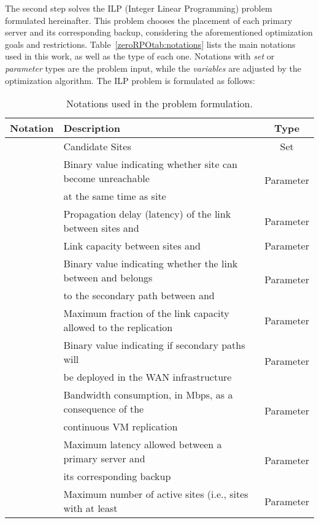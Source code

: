 \documentclass[preprint]{elsarticle}
\begin{document}
The second step solves the ILP (Integer Linear Programming) problem formulated hereinafter. This problem chooses the placement of each primary server and its corresponding backup, considering the aforementioned optimization goals and restrictions. Table~\ref{zeroRPOtab:notations} lists the main notations used in this work, as well as the type of each one. Notations with \textit{set} or \textit{parameter} types are the problem input, while the \textit{variables} are adjusted by the optimization algorithm. The ILP problem is formulated as follows:
\begin{table}
\caption{Notations used in the problem formulation.}
\centering
\scriptsize
\begin{center}
\begin{tabular}{|c||l||c|}
\hline \textbf{Notation} &\textbf{Description} &\textbf{Type}\\
\hline  &Candidate Sites &Set\\
\hline \multirow{2}{*}{} &Binary value indicating whether site  can become unreachable &\multirow{2}{*}{Parameter}\\
&at the same time as site   &\\
\hline  &Propagation delay (latency) of the link between sites  and  &Parameter\\
\hline  &Link capacity between sites  and  &Parameter\\
\hline \multirow{2}{*}{} &Binary value indicating whether the link between  and  belongs &\multirow{2}{*}{Parameter}\\
&to the secondary path between  and  &\\
\hline  &Maximum fraction of the link capacity allowed to the replication &Parameter\\
\hline \multirow{2}{*}{} &Binary value indicating if secondary paths will &\multirow{2}{*}{Parameter}\\
&be deployed in the WAN infrastructure&\\
\hline \multirow{2}{*}{} &Bandwidth consumption, in Mbps, as a consequence of the  &\multirow{2}{*}{Parameter}\\
&continuous VM replication &\\
\hline \multirow{2}{*}{} &Maximum latency allowed between a primary server and  &\multirow{2}{*}{Parameter}\\
&its corresponding backup &\\
\hline \multirow{2}{*}{} &Maximum number of active sites (i.e., sites with at least   &\multirow{2}{*}{Parameter}\\

\end{tabular}
\end{center}
\end{table}
\end{document}
